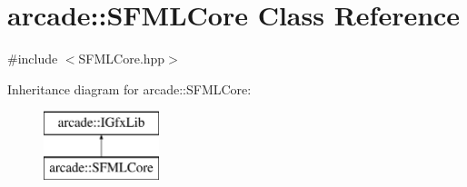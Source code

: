 \hypertarget{classarcade_1_1_s_f_m_l_core}{\section{arcade\-:\-:S\-F\-M\-L\-Core Class Reference}
\label{classarcade_1_1_s_f_m_l_core}
}


{\ttfamily \#include $<$S\-F\-M\-L\-Core.\-hpp$>$}

Inheritance diagram for arcade\-:\-:S\-F\-M\-L\-Core\-:\begin{figure}[H]
\begin{center}
\leavevmode
\includegraphics[height=2.000000cm]{classarcade_1_1_s_f_m_l_core}
\end{center}
\end{figure}
